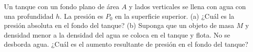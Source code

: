 \item Un tanque con un fondo plano de área $A$ y lados verticales se llena con agua con una profundidad $h$. La presión es $P_0$ en la superficie superior. (a) ¿Cuál es la presión absoluta en el fondo del tanque? (b) Suponga que un objeto de masa $M$ y densidad menor a la densidad del agua se coloca en el tanque y flota. No se desborda agua. ¿Cuál es el aumento resultante de presión en el fondo del tanque?
